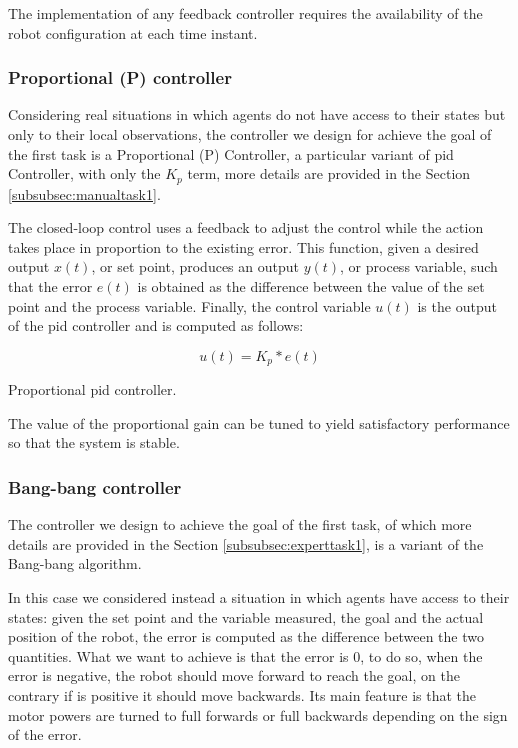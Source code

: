 The implementation of any feedback controller requires the availability of the 
robot configuration at each time instant. 

\subsubsection{Proportional (P) controller}
\label{subsubsec:pid}

Considering real situations in which agents do not have access to their states but 
only to their local observations, the controller we design for achieve the goal of 
the first task is a Proportional (P) Controller,  a particular variant of \gls{pid} 
Controller, with only the $K_p$ term, more details are provided in the Section 
\ref{subsubsec:manualtask1}.

The closed-loop control uses a feedback to adjust the control while the action 
takes place in proportion to the existing error. This function, given a desired 
output $x(t)$, or set point, produces an output $y(t)$, or process variable, such 
that the error $e(t)$ is obtained as the difference between the value of the set 
point and the process variable. Finally, the control variable $u(t)$ is the output of 
the \gls{pid} controller and is computed as follows:
\begin{Equation}[!h]
	\centering
	\begin{equation}
	u(t) = K_p * e(t)
	\end{equation}
	\caption[Proportioal PID controller.]{Proportional \gls{pid} controller.}
	\label{eq:pid}
\end{Equation}

The value of the proportional gain can be tuned to yield satisfactory 
performance so that the system is stable.

\subsubsection{Bang-bang controller}
\label{subsubsec:bangbang}
The controller we design to achieve the goal of the first task, of which more 
details are provided in the Section \ref{subsubsec:experttask1}, is a variant of the 
Bang-bang algorithm.

In this case we considered instead a situation in which agents have access to their 
states: given the set point and the variable measured, the goal and the actual 
position of the robot, the error is computed as the difference between the two 
quantities.
What we want to achieve is that the error is 0, to do so, when the error is negative, 
the robot should move forward to reach the goal, on the contrary if is positive it 
should move backwards. Its main feature is that the motor powers are turned to 
full forwards or full backwards depending on the sign of the error. 

